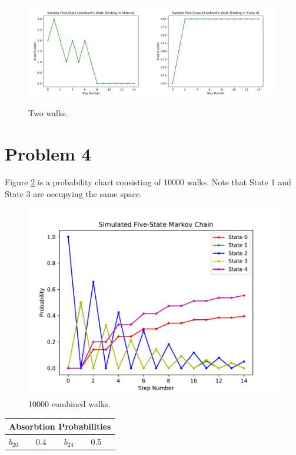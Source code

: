\documentclass{article}
\begin{document}
\begin{figure}[H]
    \centering
    \includegraphics[width=0.49\textwidth]{Images/Problem3Figure2}
    \includegraphics[width=0.49\textwidth]{Images/Problem3Figure3}
    \caption{Two walks.}
    \label{P3:walks}
\end{figure}

\section{Problem 4}
Figure \ref{P3:together} is a probability chart consisting
of \num{10000} walks. Note that State 1 and State 3 are
occupying the same space.

\begin{figure}[H]
    \centering
    \includegraphics[width=\textwidth]{Images/Problem3Figure1}
    \caption{\num{10000} combined walks.}
    \label{P3:together}
\end{figure}

\begin{table}[]
    \begin{tabular}{|l|l|l|l|}
    \hline
    \multicolumn{4}{|l|}{Absorbtion Probabilities} \\ \hline
    \(b_{20}\) & 0.4 & \(b_{24}\) & 0.5 \\ \hline
    \end{tabular}
\end{table}
\end{document}
